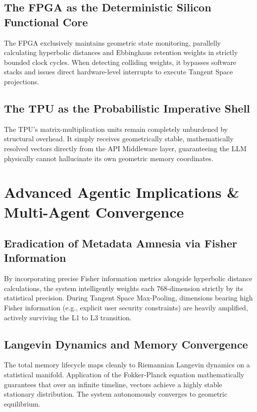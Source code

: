 \documentclass[11pt, a4paper]{article}
\begin{document}
	\subsection{The FPGA as the Deterministic Silicon Functional Core}
	The FPGA exclusively maintains geometric state monitoring, parallelly calculating hyperbolic distances and Ebbinghaus retention weights in strictly bounded clock cycles. When detecting colliding weights, it bypasses software stacks and issues direct hardware-level interrupts to execute Tangent Space projections.
	
	\subsection{The TPU as the Probabilistic Imperative Shell}
	The TPU's matrix-multiplication units remain completely unburdened by structural overhead. It simply receives geometrically stable, mathematically resolved vectors directly from the API Middleware layer, guaranteeing the LLM physically cannot hallucinate its own geometric memory coordinates.

    \section{Advanced Agentic Implications \& Multi-Agent Convergence}
    
    \subsection{Eradication of Metadata Amnesia via Fisher Information}
    By incorporating precise Fisher information metrics alongside hyperbolic distance calculations, the system intelligently weights each 768-dimension strictly by its statistical precision. During Tangent Space Max-Pooling, dimensions bearing high Fisher information (e.g., explicit user security constraints) are heavily amplified, actively surviving the L1 to L3 transition.
    
    \subsection{Langevin Dynamics and Memory Convergence}
    The total memory lifecycle maps cleanly to Riemannian Langevin dynamics on a statistical manifold. Application of the Fokker-Planck equation mathematically guarantees that over an infinite timeline, vectors achieve a highly stable stationary distribution. The system autonomously converges to geometric equilibrium.
    
\end{document}
